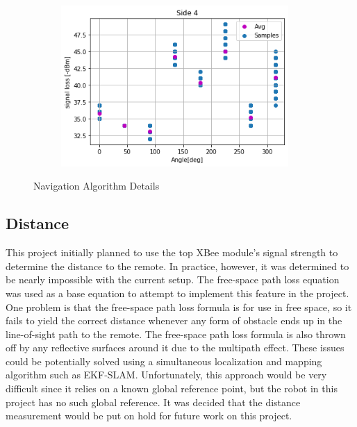 \begin{figure}[H]
\begin{subfigure}{0.50\textwidth}
        \label{fig:Side3Dat}
    \end{subfigure}%
    \begin{subfigure}{0.50\textwidth}
        \centering
        \includegraphics[width=0.95\textwidth]{figs/img/Side4_Data.png}
        \label{fig:Side4Dat}
    \end{subfigure}
    \caption{Navigation Algorithm Details}
    \label{fig:SensorDataGraphs}
\end{figure}

\subsection{Distance}
This project initially planned to use the top XBee module's signal strength to determine the distance to the remote. In practice, however, it was determined to be nearly impossible with the current setup. The free-space path loss equation was used as a base equation to attempt to implement this feature in the project. One problem is that the free-space path loss formula is for use in free space, so it fails to yield the correct distance whenever any form of obstacle ends up in the line-of-sight path to the remote. The free-space path loss formula is also thrown off by any reflective surfaces around it due to the multipath effect. These issues could be potentially solved using a simultaneous localization and mapping algorithm such as EKF-SLAM.  Unfortunately, this approach would be very difficult since it relies on a known global reference point, but the robot in this project has no such global reference. It was decided that the distance measurement would be put on hold for future work on this project.

